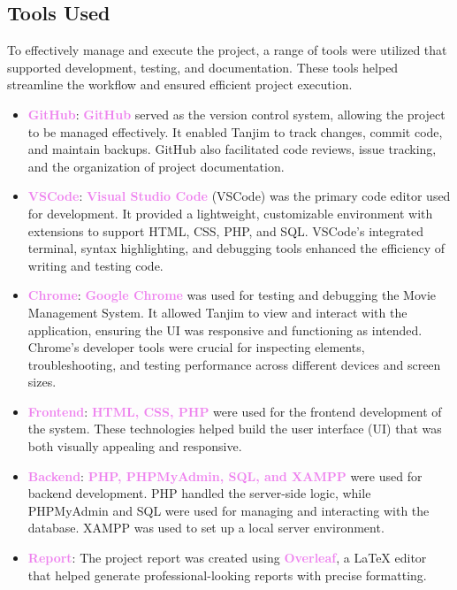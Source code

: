 \documentclass[a4paper,12pt]{article}  %
\renewcommand{\textbf}[1]{\textcolor{violet}{\bfseries #1}}
\begin{document}
\subsection{Tools Used}
To effectively manage and execute the project, a range of tools were utilized that supported development, testing, and documentation. These tools helped streamline the workflow and ensured efficient project execution.

\begin{itemize}
    \item \textbf{GitHub}: \textbf{GitHub} served as the version control system, allowing the project to be managed effectively. It enabled Tanjim to track changes, commit code, and maintain backups. GitHub also facilitated code reviews, issue tracking, and the organization of project documentation.
    
    \item \textbf{VSCode}: \textbf{Visual Studio Code} (VSCode) was the primary code editor used for development. It provided a lightweight, customizable environment with extensions to support HTML, CSS, PHP, and SQL. VSCode's integrated terminal, syntax highlighting, and debugging tools enhanced the efficiency of writing and testing code.
    
    \item \textbf{Chrome}: \textbf{Google Chrome} was used for testing and debugging the Movie Management System. It allowed Tanjim to view and interact with the application, ensuring the UI was responsive and functioning as intended. Chrome’s developer tools were crucial for inspecting elements, troubleshooting, and testing performance across different devices and screen sizes.
    
    \item \textbf{Frontend}: \textbf{HTML, CSS, PHP} were used for the frontend development of the system. These technologies helped build the user interface (UI) that was both visually appealing and responsive.
    
    \item \textbf{Backend}: \textbf{PHP, PHPMyAdmin, SQL, and XAMPP} were used for backend development. PHP handled the server-side logic, while PHPMyAdmin and SQL were used for managing and interacting with the database. XAMPP was used to set up a local server environment.
    
    \item \textbf{Report}: The project report was created using \textbf{Overleaf}, a LaTeX editor that helped generate professional-looking reports with precise formatting.
    

\end{itemize}
\end{document}
